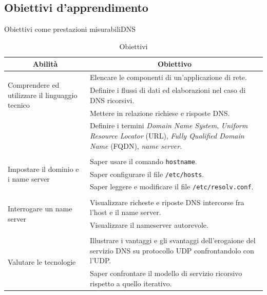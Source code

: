 \documentclass[italian]{beamer}
\begin{document}
\subsection[Obiettivi]{Obiettivi d'apprendimento}
\begin{frame}{Obiettivi come prestazioni misurabili}{DNS}
	
	
	{\tiny
	\begin{table}
		\begin{tabular}{@{}p{}p{}@{}} \toprule
			\multicolumn{1}{c}{Abilit\`a} & \multicolumn{1}{c}{Obiettivo} \\ \midrule
			
			\multirow{3}{*}{\parbox{0.2\textwidth}{Comprendere ed utilizzare il linguaggio tecnico}}
			 & Elencare le componenti di un'applicazione di rete.\\
			 & Definire i flussi di dati ed elaborazioni nel caso di DNS ricorsivi.\\
			 & Mettere in relazione richiese e risposte DNS.\\
			 & Definire i termini \textit{Domain Name System}, \textit{Uniform Resource Locator} (URL), \textit{Fully Qualified Domain Name} (FQDN), \textit{name server}.\\
			 
			 \\
			 
			 \multirow{3}{*}{\parbox{0.2\textwidth}{Impostare il dominio e i name server}}
			 & Saper usare il comando \texttt{hostname}.\\
			 & Saper configurare il file \texttt{/etc/hosts}.\\
			 & Saper leggere e modificare il file \texttt{/etc/resolv.conf}.\\
			  \\
			 
			 
			 \multirow{2}{*}{\parbox{0.2\textwidth}{Interrogare un name server}}
			 & Visualizzare richeste e riposte DNS intercorse fra l'host e il name server.\\
			 & Visualizzare il nameserver autorevole.\\
			 
			 \\
			
			 \multirow{2}{*}{\parbox{0.2\textwidth}{Valutare le tecnologie}}
			 & Illustrare i vantaggi e gli svantaggi dell'erogaione del servizio DNS su protocollo UDP confrontandolo con l'UDP.\\
			 & Saper confrontare il modello di servizio ricorsivo rispetto a quello iterativo.\\
			
		\bottomrule
		\end{tabular}
		\caption{Obiettivi}
	\end{table}
	}
	
\end{frame}
\end{document}
